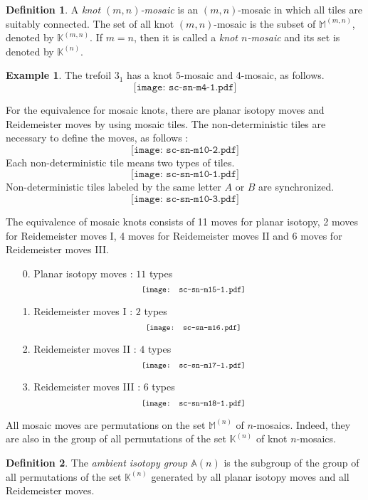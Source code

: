 \documentclass{article}
\theoremstyle{definition}
\newtheorem{example}{Example}
\newtheorem{definition}{Definition}
\begin{document}
\begin{definition}
A \textit{knot $(m, n)$-mosaic} is an $(m, n)$-mosaic in which all tiles are suitably connected. The set of all knot $(m, n)$-mosaic is the subset of $\mathbb{M}^{(m, n)}$, denoted by $\mathbb{K}^{(m, n)}$. 
If $m=n$, then it is called a \textit{knot $n$-mosaic} and its set is denoted by $\mathbb{K}^{(n)}$.
\end{definition}

\begin{example}
The trefoil $3_{1}$ has a knot $5$-mosaic and $4$-mosaic, as follows.
\[\texttt{[image: sc-sn-m4-1.pdf]}\]
\end{example}

For the equivalence for mosaic knots, there are planar isotopy moves and Reidemeister moves by using mosaic tiles. The non-deterministic tiles are necessary to define the moves, as follows :
\[\texttt{[image: sc-sn-m10-2.pdf]}\]
Each non-deterministic tile means two types of tiles. 
\[\texttt{[image: sc-sn-m10-1.pdf]}\]
Non-deterministic tiles labeled by the same letter $A$ or $B$ are synchronized.
\[\texttt{[image: sc-sn-m10-3.pdf]}\]

The equivalence of mosaic knots consists of 11 moves for planar isotopy, 2 moves for Reidemeister moves I, 4 moves for Reidemeister moves II and 6 moves for Reidemeister moves III.
\begin{itemize}
  \item[0.] Planar isotopy moves : $11$ types
  \[\scalebox{0.8}{\texttt{[image: sc-sn-m15-1.pdf]}}\]
  \item[1.] Reidemeister moves I : $2$ types
  \[\scalebox{0.8}{\texttt{[image: sc-sn-m16.pdf]}}\]
  \item[2.] Reidemeister moves II : $4$ types
  \[\scalebox{0.8}{\texttt{[image: sc-sn-m17-1.pdf]}}\]
  \item[3.] Reidemeister moves III : $6$ types
  \[\scalebox{0.8}{\texttt{[image: sc-sn-m18-1.pdf]}}\]
\end{itemize}

All mosaic moves are permutations on the set $\mathbb{M}^{(n)}$ of $n$-mosaics. Indeed, they are also in the group of all permutations of the set $\mathbb{K}^{(n)}$ of knot $n$-mosaics.

\begin{definition}
The \textit{ambient isotopy group $\mathbb{A}(n)$} is the subgroup of the group of all permutations of the set $\mathbb{K}^{(n)}$ generated by all planar isotopy moves and all Reidemeister moves.  
\end{definition}
\end{document}
